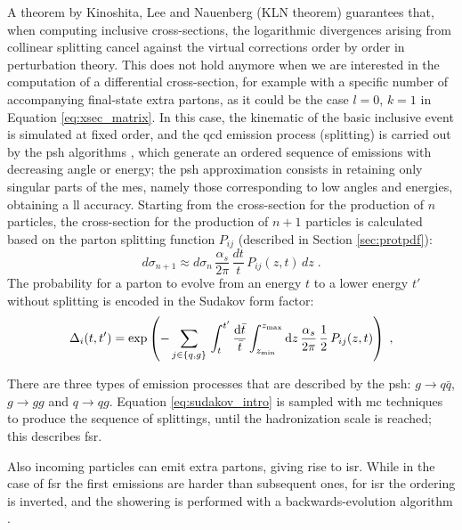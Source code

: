 A theorem by Kinoshita, Lee and Nauenberg (KLN theorem) \cite{Kinoshita:1962ur,Lee:1964is} guarantees that, 
when computing inclusive cross-sections, the logarithmic divergences arising from collinear splitting cancel against the virtual corrections order by order in perturbation theory. 
This does not hold anymore when we are interested in the computation of a differential cross-section, for example with a specific number of accompanying final-state extra partons, 
as it could be the case $l=0$, $k=1$ in Equation \ref{eq:xsec_matrix}. 
In this case, the kinematic of the basic inclusive event is simulated at fixed order, and the \gls{qcd} emission process (splitting) is carried out by the \gls{psh} algorithms \cite{Fox:1979ag}, which generate an ordered sequence of emissions with decreasing angle or energy; the \gls{psh} approximation consists in retaining only singular parts of the \glspl{me}, namely those corresponding to low angles and energies, obtaining a \gls{ll} accuracy.
Starting from the cross-section for the production of $n$ particles, the cross-section for the production 
of $n+1$ particles is calculated based on the parton splitting function $P_{ij}$ (described in Section \ref{sec:protpdf}):
\begin{equation}
d\sigma_{n+1} \approx d\sigma_n \, \frac{ \alpha_s }{2 \pi } \, \frac{dt}{t}  \,  P_{ij}(z, t) \, dz \; .
\end{equation}
The probability for a parton to evolve from an energy $t$ to a lower energy $t'$ without splitting is encoded in the Sudakov form factor:
\begin{equation}
  \Delta_i(t,t')=\exp\left(-\sum_{j\in\{q,g\}}\,
  \int_t^{t'}\frac{{\rm{d}}\bar{t}}{\bar{t}}\int_{z_{\rm min}}^{z_{\rm max}}{\rm{d}} z\,
  \frac{ \alpha_s }{2 \pi } \, \frac{1}{2} \, P_{ij}(z, t) \right) \;,
  \label{eq:sudakov_intro}
\end{equation}

There are three types of emission processes that are described by the \gls{psh}: $g \rightarrow q\bar{q}$, $g \rightarrow gg$ and $q \rightarrow q g$.
Equation \ref{eq:sudakov_intro} is sampled with \gls{mc} techniques to produce the sequence of splittings, until the hadronization scale is reached;
this describes \gls{fsr}.

Also incoming particles can emit extra partons, giving rise to \gls{isr}. 
While in the case of \gls{fsr} the first emissions are harder than subsequent ones, 
for \gls{isr} the ordering is inverted, and the showering is performed with a backwards-evolution algorithm \cite{Sjostrand:1985xi}.

